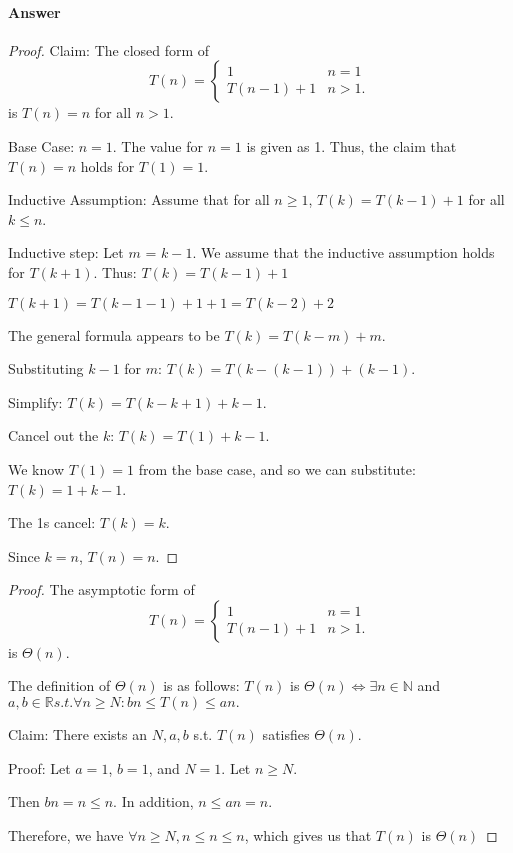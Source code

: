 \documentclass{article}
\begin{document}
\paragraph{Answer}
\begin{proof}
Claim: The closed form of $$T(n) = \begin{cases}
            1        & n=1\\
            T(n-1)+1 & n>1.
         \end{cases}
$$ is $T(n) = n$ for all $n > 1$. 

Base Case: $n = 1$. The value for $n = 1$ is given as 1. Thus, the claim that $T(n) = n$ holds for $T(1) = 1$. 

Inductive Assumption: Assume that for all $n \geq 1$, $T(k) = T(k-1) + 1$ for all $k \leq n$.

Inductive step: Let $m$ = $k - 1$. We assume that the inductive assumption holds for $T(k + 1)$. Thus: 
$T(k) = T(k-1) + 1$

$T(k + 1) = T(k - 1 - 1) + 1  + 1 = T(k - 2) + 2$

The general formula appears to be $T(k) = T(k - m) + m.$

Substituting $k-1$ for $m$: $T(k) = T(k - (k - 1)) + (k - 1).$

Simplify: $T(k) = T(k - k + 1) + k - 1.$

Cancel out the $k$: $T(k) = T(1) + k - 1.$

We know $T(1) = 1$ from the base case, and so we can substitute: $T(k) = 1 + k - 1$.

The 1s cancel: $T(k) = k$. 

Since $k = n$, $T(n) = n$.
\end{proof}

\begin{proof}
The asymptotic form of $$T(n) = \begin{cases}
            1        & n=1\\
            T(n-1)+1 & n>1.
         \end{cases}
$$ is $\Theta(n)$. 

The definition of $\Theta(n)$ is as follows: $T(n)$ is $\Theta(n) \Leftrightarrow \exists  n \in \mathbb{N}$ and $a, b \in \mathbb{R} s.t. \forall n \geq N: bn \leq T(n) \leq an.$ 

Claim: There exists an $N, a, b$ s.t. $T(n)$ satisfies $\Theta(n)$.

Proof: Let $a = 1$, $b = 1$, and $N = 1$. Let $n \geq N$. 

Then $bn = n \leq n.$ In addition, $n \leq an = n$. 

Therefore,  we have $\forall n \geq N, n \leq n \leq n$, which gives us that $T(n)$ is $\Theta(n)$
\end{proof}
\end{document}
